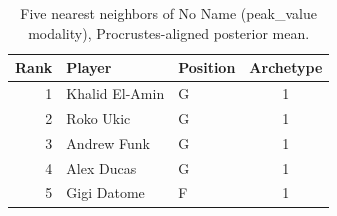 \begin{table}[htbp]
  \centering\small
  \begin{tabular}{rllc}
    \toprule
    Rank & Player & Position & Archetype \\
    \midrule
    1 & Khalid El-Amin & G & 1 \\
    2 & Roko Ukic & G & 1 \\
    3 & Andrew Funk & G & 1 \\
    4 & Alex Ducas & G & 1 \\
    5 & Gigi Datome & F & 1 \\
    \bottomrule
  \end{tabular}
  \caption{Five nearest neighbors of No Name (peak_value modality), Procrustes-aligned posterior mean.}
  \label{tab:No_Name_neighbors_peak_value}
\end{table}

